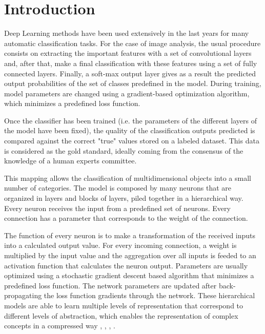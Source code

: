 \documentclass[review]{elsarticle}
\theoremstyle{definition} %
\theoremstyle{remark}
\begin{document}
\section{Introduction}

Deep Learning methods have been used extensively in the last years for many automatic classification tasks. For the case of image analysis, the usual procedure consists on extracting the important features with a set of convolutional layers and, after that, make a final classification with these features using a set of fully connected layers. Finally, a soft-max output layer gives as a result the predicted output probabilities of the set of classes predefined in the model. During training, model parameters are changed using a gradient-based optimization algorithm, which minimizes a predefined loss function. 

Once the classifier has been trained (i.e. the parameters of the different layers of the model have been fixed), the quality of the classification outputs predicted is compared against the correct "true" values stored on a labeled dataset. This data is considered as the gold standard, ideally coming from the consensus of the knowledge of a human experts committee.

This mapping allows the classification of multidimensional objects into a small number of categories. The model is composed by many neurons that are organized in layers and blocks of layers, piled together in a hierarchical way. Every neuron receives the input from a predefined set of neurons. Every connection has a parameter that corresponds to the weight of the connection. 

The function of every neuron is to make a transformation of the received inputs into a calculated output value. For every incoming connection, a weight is multiplied by the input value and the aggregation over all inputs is feeded to an activation function that calculates the neuron output. Parameters are usually optimized using a stochastic gradient descent based algorithm that minimizes a predefined loss function. The network parameters are updated after back-propagating the loss function gradients through the network. These hierarchical models are able to learn multiple levels of representation that correspond to different levels of abstraction, which enables the representation of complex concepts in a compressed way \cite{nature-deep-learning}, \cite{888}, \cite{Bengio:2013:RLR:2498740.2498889}, \cite{bengio-2009}.

\vspace{1cm} %
 
\end{document}
